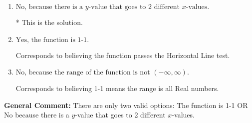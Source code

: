 \documentclass{extbook}[14pt]
\begin{document}
\begin{enumerate}
{\begin{enumerate}[label=\Alph*.]
Corresponds to the Vertical Line test, which checks if an expression is a function.
\item \( \text{No, because there is a $y$-value that goes to 2 different $x$-values.} \)

* This is the solution.
\item \( \text{Yes, the function is 1-1.} \)

Corresponds to believing the function passes the Horizontal Line test.
\item \( \text{No, because the range of the function is not $(-\infty, \infty)$.} \)

Corresponds to believing 1-1 means the range is all Real numbers.
\end{enumerate}

\textbf{General Comment:} There are only two valid options: The function is 1-1 OR No because there is a $y$-value that goes to 2 different $x$-values.
}
\end{enumerate}
\end{document}
